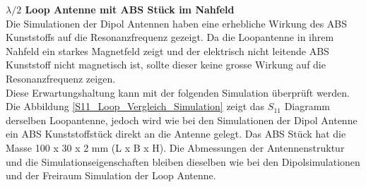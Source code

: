 
\textbf{$\lambda/2$ Loop Antenne mit ABS Stück im Nahfeld}\\
Die Simulationen der Dipol Antennen haben eine erhebliche Wirkung des ABS Kunststoffs auf die Resonanzfrequenz gezeigt. Da die Loopantenne in ihrem Nahfeld ein starkes Magnetfeld zeigt und der elektrisch nicht leitende ABS Kunststoff nicht magnetisch ist, sollte dieser keine grosse Wirkung auf die Resonanzfrequenz zeigen.\\ Diese Erwartungshaltung kann mit der folgenden Simulation überprüft werden.\\
 
Die Abbildung \ref{S11_Loop_Vergleich_Simulation} zeigt das $S_{11}$ Diagramm derselben Loopantenne, jedoch wird wie bei den Simulationen der Dipol Antenne ein ABS Kunststoffstück direkt an die Antenne gelegt. Das ABS Stück hat die Masse 100 x 30 x 2 mm (L x B x H). Die Abmessungen der Antennenstruktur und die Simulationseigenschaften bleiben dieselben wie bei den Dipolsimulationen und der Freiraum Simulation der Loop Antenne.\\

